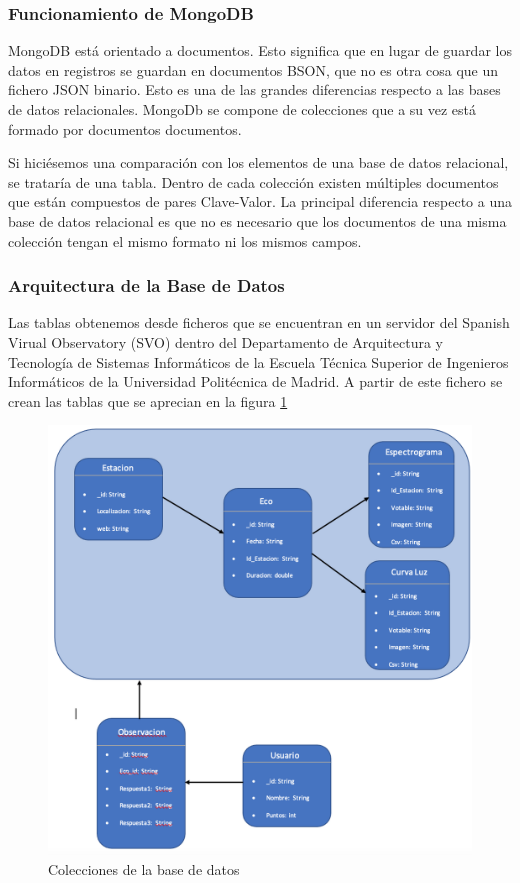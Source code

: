 \subsubsection{Funcionamiento de MongoDB}
MongoDB está orientado a documentos. Esto significa que en lugar de guardar los datos en registros se guardan en documentos BSON, que no es otra cosa que un fichero JSON binario.
Esto es una de las grandes diferencias respecto a las bases de datos relacionales. 
MongoDb se compone de colecciones que a su vez está formado por documentos documentos. 

Si hiciésemos una comparación con los elementos de una base de datos relacional, se trataría de una tabla. Dentro de cada colección existen múltiples documentos que están compuestos de pares Clave-Valor. 
La principal diferencia respecto a una base de datos relacional es que no es necesario que los documentos de una misma colección tengan el mismo formato ni los mismos campos.

\subsubsection{Arquitectura de la Base de Datos}

Las tablas obtenemos desde ficheros que se encuentran en un servidor del Spanish Virual Observatory (SVO) dentro del Departamento de Arquitectura y Tecnología de Sistemas Informáticos de la Escuela Técnica Superior de Ingenieros Informáticos de la Universidad Politécnica de Madrid. A partir de este fichero se crean las tablas que se aprecian en la figura \ref{fig:tablas_base_datos}

\begin{figure}[H]
    \centering
    \includegraphics[width=\textwidth]{include/figuras/Tablas.png}
    \caption{Colecciones de la base de datos}
    \label{fig:tablas_base_datos}
\end{figure}

